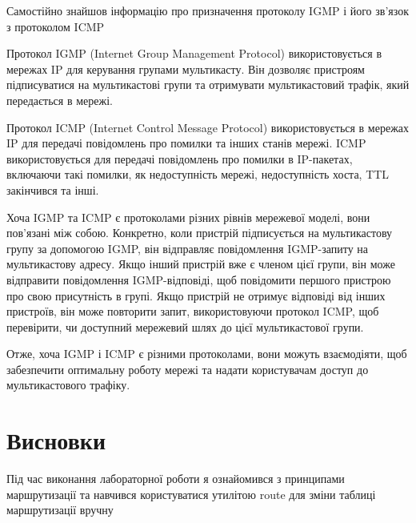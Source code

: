 \documentclass{article}
\begin{document}
\begin{normalsize}
Самостійно знайшов інформацію про призначення протоколу IGMP і його зв'язок з протоколом ICMP

Протокол IGMP (Internet Group Management Protocol) використовується в мережах IP для керування групами мультикасту. Він дозволяє пристроям підписуватися на мультикастові групи та отримувати мультикастовий трафік, який передається в мережі.

Протокол ICMP (Internet Control Message Protocol) використовується в мережах IP для передачі повідомлень про помилки та інших станів мережі. ICMP використовується для передачі повідомлень про помилки в IP-пакетах, включаючи такі помилки, як недоступність мережі, недоступність хоста, TTL закінчився та інші.

Хоча IGMP та ICMP є протоколами різних рівнів мережевої моделі, вони пов'язані між собою. Конкретно, коли пристрій підписується на мультикастову групу за допомогою IGMP, він відправляє повідомлення IGMP-запиту на мультикастову адресу. Якщо інший пристрій вже є членом цієї групи, він може відправити повідомлення IGMP-відповіді, щоб повідомити першого пристрою про свою присутність в групі. Якщо пристрій не отримує відповіді від інших пристроїв, він може повторити запит, використовуючи протокол ICMP, щоб перевірити, чи доступний мережевий шлях до цієї мультикастової групи.

Отже, хоча IGMP і ICMP є різними протоколами, вони можуть взаємодіяти, щоб забезпечити оптимальну роботу мережі та надати користувачам доступ до мультикастового трафіку.
\section*{Висновки}
Під час виконання лабораторної роботи я ознайомився з принципами маршрутизації та навчився користуватися утилітою route для зміни таблиці маршрутизації вручну
	    
\end{normalsize}
\end{document}
